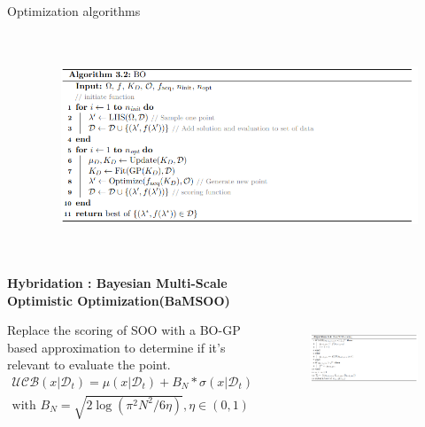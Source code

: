 \begin{frame}[allowframebreaks]{Optimization algorithms}
\begin{columns}
\begin{column}{0.3\textwidth}
        \end{column}        
        \begin{column}{0.7\textwidth}
            \begin{figure}[h]
                \centering
                \includegraphics[height = 6cm]{imgs/algo/bo.png}
            \end{figure}
        \end{column}
    \end{columns}

    \framebreak

    \begin{columns}
        \begin{column}{0.5\textwidth}
            \textbf{Hybridation : Bayesian Multi-Scale Optimistic Optimization(BaMSOO)}

            Replace the scoring of SOO with a BO-GP based approximation to determine if it's relevant to evaluate the point.
            \begin{equation}
                \begin{split}
                \mathcal{UCB}(x| \mathcal D_t) = \mu(x|\mathcal D_t) +  B_N * \sigma(x|\mathcal D_t) 
                \\ \text{with } B_N = \sqrt{2 \log (\pi^2 N^2/6 \eta)} , \eta \in (0,1)      
                \end{split}  
                \label{eq:ucb}
            \end{equation}
            
        \end{column}        
        \begin{column}{0.5\textwidth}
            \begin{figure}[h]
                \centering
                \includegraphics[trim={0 0 12cm 0},clip,height = 5cm]{imgs/algo/bamsoo_score.png}
            \end{figure}
        \end{column}
    \end{columns}


\end{frame}
